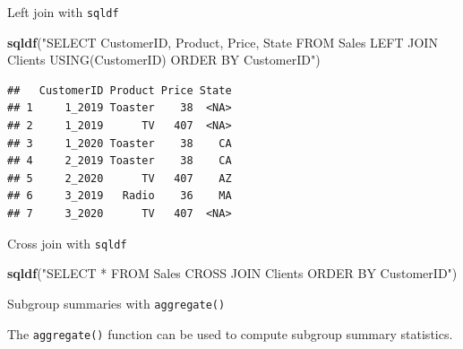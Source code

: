\documentclass[ignorenonframetext,]{beamer}
\newenvironment{Shaded}{\begin{snugshade}}{\end{snugshade}}
\newcommand{\KeywordTok}[1]{\textcolor[rgb]{0.13,0.29,0.53}{\textbf{#1}}}
\newcommand{\NormalTok}[1]{#1}
\newcommand{\StringTok}[1]{\textcolor[rgb]{0.31,0.60,0.02}{#1}}
\begin{document}
\begin{frame}[fragile]{Left join with \texttt{sqldf}}
\protect\hypertarget{left-join-with-sqldf}{}

\begin{Shaded}
\begin{Highlighting}[]
\KeywordTok{sqldf}\NormalTok{(}\StringTok{"SELECT CustomerID, Product, Price, State }
\StringTok{       FROM Sales}
\StringTok{       LEFT JOIN Clients }
\StringTok{       USING(CustomerID)}
\StringTok{       ORDER BY CustomerID"}\NormalTok{)}
\end{Highlighting}
\end{Shaded}

\begin{verbatim}
##   CustomerID Product Price State
## 1     1_2019 Toaster    38  <NA>
## 2     1_2019      TV   407  <NA>
## 3     1_2020 Toaster    38    CA
## 4     2_2019 Toaster    38    CA
## 5     2_2020      TV   407    AZ
## 6     3_2019   Radio    36    MA
## 7     3_2020      TV   407  <NA>
\end{verbatim}

\end{frame}

\begin{frame}[fragile]{Cross join with \texttt{sqldf}}
\protect\hypertarget{cross-join-with-sqldf}{}

\begin{Shaded}
\begin{Highlighting}[]
\KeywordTok{sqldf}\NormalTok{(}\StringTok{"SELECT * }
\StringTok{       FROM Sales}
\StringTok{       CROSS JOIN Clients }
\StringTok{       ORDER BY CustomerID"}\NormalTok{)}
\end{Highlighting}
\end{Shaded}

\end{frame}

\begin{frame}[fragile]{Subgroup summaries with \texttt{aggregate()}}
\protect\hypertarget{subgroup-summaries-with-aggregate}{}

The \texttt{aggregate()} function can be used to compute subgroup
summary statistics.

\end{frame}
\end{document}
